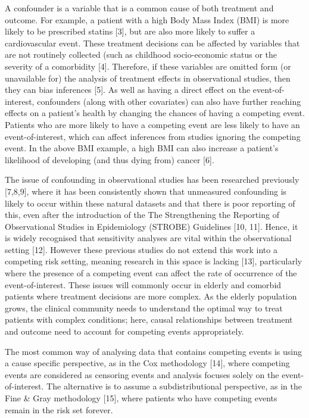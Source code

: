 \documentclass[12pt,PhD,twoside,openright]{muthesis}
\begin{document}
A confounder is a variable that is a common cause of both treatment and outcome. For example, a patient with a high Body Mass Index (BMI) is more likely to be prescribed statins {[}3{]}, but are also more likely to suffer a cardiovascular event. These treatment decisions can be affected by variables that are not routinely collected (such as childhood socio-economic status or the severity of a comorbidity {[}4{]}. Therefore, if these variables are omitted form (or unavailable for) the analysis of treatment effects in observational studies, then they can bias inferences {[}5{]}. As well as having a direct effect on the event-of-interest, confounders (along with other covariates) can also have further reaching effects on a patient's health by changing the chances of having a competing event. Patients who are more likely to have a competing event are less likely to have an event-of-interest, which can affect inferences from studies ignoring the competing event. In the above BMI example, a high BMI can also increase a patient's likelihood of developing (and thus dying from) cancer {[}6{]}.

The issue of confounding in observational studies has been researched previously {[}7,8,9{]}, where it has been consistently shown that unmeasured confounding is likely to occur within these natural datasets and that there is poor reporting of this, even after the introduction of the The Strengthening the Reporting of Observational Studies in Epidemiology (STROBE) Guidelines {[}10, 11{]}. Hence, it is widely recognised that sensitivity analyses are vital within the observational setting {[}12{]}. However these previous studies do not extend this work into a competing risk setting, meaning research in this space is lacking {[}13{]}, particularly where the presence of a competing event can affect the rate of occurrence of the event-of-interest. These issues will commonly occur in elderly and comorbid patients where treatment decisions are more complex. As the elderly population grows, the clinical community needs to understand the optimal way to treat patients with complex conditions; here, causal relationships between treatment and outcome need to account for competing events appropriately.

The most common way of analysing data that contains competing events is using a cause specific perspective, as in the Cox methodology {[}14{]}, where competing events are considered as censoring events and analysis focuses solely on the event-of-interest. The alternative is to assume a subdistributional perspective, as in the Fine \& Gray methodology {[}15{]}, where patients who have competing events remain in the risk set forever.
\end{document}
